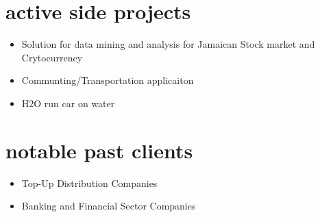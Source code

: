 \documentclass[]{friggeri-cvRS}
\begin{document}

\section{active side projects}
\begin{itemize}
	\item Solution for data mining and analysis for Jamaican Stock market and Crytocurrency
    	\item Communting/Transportation applicaiton 
	\item H2O run car on water
\end{itemize}


\section{notable past clients}
\begin{itemize}
	\item Top-Up Distribution Companies
    	\item Banking and Financial Sector Companies
\end{itemize}

\end{document}
